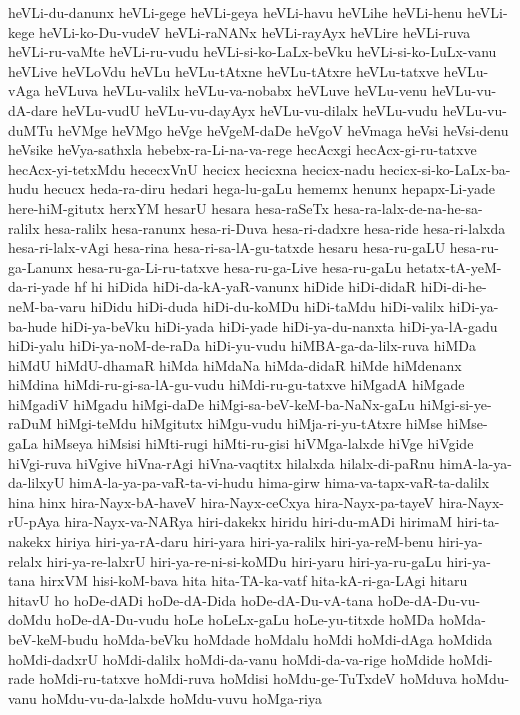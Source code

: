 {heVLi-du-danunx
heVLi-gege
heVLi-geya
heVLi-havu
heVLihe
heVLi-henu
heVLi-kege
heVLi-ko-Du-vudeV
heVLi-raNANx
heVLi-rayAyx
heVLire
heVLi-ruva
heVLi-ru-vaMte
heVLi-ru-vudu
heVLi-si-ko-LaLx-beVku
heVLi-si-ko-LuLx-vanu
heVLive
heVLoVdu
heVLu
heVLu-tAtxne
heVLu-tAtxre
heVLu-tatxve
heVLu-vAga
heVLuva
heVLu-valilx
heVLu-va-nobabx
heVLuve
heVLu-venu
heVLu-vu-dA-dare
heVLu-vudU
heVLu-vu-dayAyx
heVLu-vu-dilalx
heVLu-vudu
heVLu-vu-duMTu
heVMge
heVMgo
heVge
heVgeM-daDe
heVgoV
heVmaga
heVsi
heVsi-denu
heVsike
heVya-sathxla
hebebx-ra-Li-na-va-rege
hecAcxgi
hecAcx-gi-ru-tatxve
hecAcx-yi-tetxMdu
hececxVnU
hecicx
hecicxna
hecicx-nadu
hecicx-si-ko-LaLx-ba-hudu
hecucx
heda-ra-diru
hedari
hega-lu-gaLu
hememx
henunx
hepapx-Li-yade
here-hiM-gitutx
herxYM
hesarU
hesara
hesa-raSeTx
hesa-ra-lalx-de-na-he-sa-ralilx
hesa-ralilx
hesa-ranunx
hesa-ri-Duva
hesa-ri-dadxre
hesa-ride
hesa-ri-lalxda
hesa-ri-lalx-vAgi
hesa-rina
hesa-ri-sa-lA-gu-tatxde
hesaru
hesa-ru-gaLU
hesa-ru-ga-Lanunx
hesa-ru-ga-Li-ru-tatxve
hesa-ru-ga-Live
hesa-ru-gaLu
hetatx-tA-yeM-da-ri-yade
hf
hi
hiDida
hiDi-da-kA-yaR-vanunx
hiDide
hiDi-didaR
hiDi-di-he-neM-ba-varu
hiDidu
hiDi-duda
hiDi-du-koMDu
hiDi-taMdu
hiDi-valilx
hiDi-ya-ba-hude
hiDi-ya-beVku
hiDi-yada
hiDi-yade
hiDi-ya-du-nanxta
hiDi-ya-lA-gadu
hiDi-yalu
hiDi-ya-noM-de-raDa
hiDi-yu-vudu
hiMBA-ga-da-lilx-ruva
hiMDa
hiMdU
hiMdU-dhamaR
hiMda
hiMdaNa
hiMda-didaR
hiMde
hiMdenanx
hiMdina
hiMdi-ru-gi-sa-lA-gu-vudu
hiMdi-ru-gu-tatxve
hiMgadA
hiMgade
hiMgadiV
hiMgadu
hiMgi-daDe
hiMgi-sa-beV-keM-ba-NaNx-gaLu
hiMgi-si-ye-raDuM
hiMgi-teMdu
hiMgitutx
hiMgu-vudu
hiMja-ri-yu-tAtxre
hiMse
hiMse-gaLa
hiMseya
hiMsisi
hiMti-rugi
hiMti-ru-gisi
hiVMga-lalxde
hiVge
hiVgide
hiVgi-ruva
hiVgive
hiVna-rAgi
hiVna-vaqtitx
hilalxda
hilalx-di-paRnu
himA-la-ya-da-lilxyU
himA-la-ya-pa-vaR-ta-vi-hudu
hima-girw
hima-va-tapx-vaR-ta-dalilx
hina
hinx
hira-Nayx-bA-haveV
hira-Nayx-ceCxya
hira-Nayx-pa-tayeV
hira-Nayx-rU-pAya
hira-Nayx-va-NARya
hiri-dakekx
hiridu
hiri-du-mADi
hirimaM
hiri-ta-nakekx
hiriya
hiri-ya-rA-daru
hiri-yara
hiri-ya-ralilx
hiri-ya-reM-benu
hiri-ya-relalx
hiri-ya-re-lalxrU
hiri-ya-re-ni-si-koMDu
hiri-yaru
hiri-ya-ru-gaLu
hiri-ya-tana
hirxVM
hisi-koM-bava
hita
hita-TA-ka-vatf
hita-kA-ri-ga-LAgi
hitaru
hitavU
ho
hoDe-dADi
hoDe-dA-Dida
hoDe-dA-Du-vA-tana
hoDe-dA-Du-vu-doMdu
hoDe-dA-Du-vudu
hoLe
hoLeLx-gaLu
hoLe-yu-titxde
hoMDa
hoMda-beV-keM-budu
hoMda-beVku
hoMdade
hoMdalu
hoMdi
hoMdi-dAga
hoMdida
hoMdi-dadxrU
hoMdi-dalilx
hoMdi-da-vanu
hoMdi-da-va-rige
hoMdide
hoMdi-rade
hoMdi-ru-tatxve
hoMdi-ruva
hoMdisi
hoMdu-ge-TuTxdeV
hoMduva
hoMdu-vanu
hoMdu-vu-da-lalxde
hoMdu-vuvu
hoMga-riya
}

